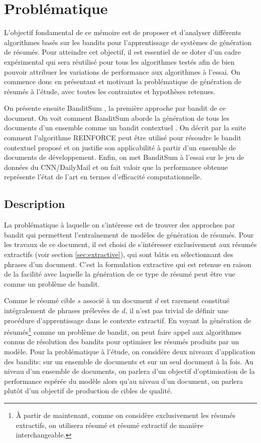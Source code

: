 \chapter{Problématique}
\label{chap:bandit_contextuel}

L'objectif fondamental de ce mémoire est de proposer et 
d'analyser différents algorithmes basés 
sur les bandits pour l'apprentissage de systèmes de génération 
de résumés.
Pour atteindre cet objectif, il est essentiel de se doter 
d'un cadre expérimental qui sera réutilisé pour tous les algorithmes
testés afin de bien pouvoir attribuer les variations de performance 
aux algorithmes à l'essai.
On commence donc en présentant et motivant 
la problématique de génération de résumés à l'étude, avec toutes 
les contraintes et hypothèses retenues.

On présente ensuite BanditSum \citep{dong2018banditsum}, la première 
approche par bandit de ce document.
On voit comment BanditSum aborde la génération de tous les documents 
d'un ensemble comme un bandit contextuel \citep{contextual_bandits}.
On décrit par la suite comment l'algorithme REINFORCE \citep{williams1992simple} 
peut être utilisé pour résoudre le bandit contextuel proposé et 
on justifie son applicabilité à partir d'un ensemble de documents de développement.
Enfin, on met BanditSum à l'essai sur le jeu de données du CNN/DailyMail \citep{hermann2015teaching}  
et on fait valoir que la performance obtenue représente l'état de l'art
en termes d'efficacité computationnelle.

\section{Description}
\label{section:problematique}

La problématique à laquelle on s'intéresse est de trouver 
des approches par bandit qui permettent l'entraînement 
de modèles de génération de résumés.
Pour les travaux de ce document, il est choisi de s'intéresser exclusivement
aux résumés extractifs (voir section \ref{sec:extractive}), qui sont bâtis
en sélectionnant des phrases d'un document.
C'est la formulation extractive qui est retenue 
en raison de la facilité avec laquelle la génération de ce type 
de résumé peut être vue comme un problème de bandit.

Comme le résumé cible $s$ associé à un document $d$ est 
rarement constitué intégralement de phrases prélevées de $d$, il n'est pas trivial 
de définir une procédure d'apprentissage dans le contexte extractif.
En voyant la génération de résumés\footnote{À partir de maintenant, comme on considère exclusivement les 
résumés extractifs, on utilisera résumé et résumé extractif
de manière interchangeable.} comme un problème de bandit, on peut faire appel 
aux algorithmes connus de résolution des bandits pour 
optimiser les résumés produits par un modèle.
Pour la problématique à l'étude, on considère deux niveaux d'application des bandits: 
sur un ensemble de documents et sur un seul document à la fois.
Au niveau d'un ensemble de documents,
on parlera d'un objectif d'optimisation de la performance espérée du modèle 
alors qu'au niveau d'un document, on parlera plutôt d'un objectif de production 
de cibles de qualité.

